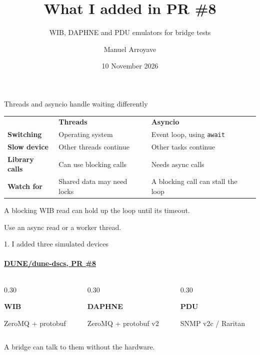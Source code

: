 \documentclass[aspectratio=169,11pt]{beamer}
\title{What I added in PR \#8}
\subtitle{WIB, DAPHNE and PDU emulators for bridge tests}
\author{Manuel Arroyave}
\date{10 November 2026}
\begin{document}
\begin{frame}[plain]
  \titlepage
\end{frame}

\begin{frame}{Threads and asyncio handle waiting differently}
  \vfill
  {\normalsize
  \renewcommand{\arraystretch}{1.7}
  \begin{tabular}{@{}p{}p{}p{}@{}}
    & \textbf{Threads} & \textbf{Asyncio} \\
    \textbf{Switching} & Operating system & Event loop, using \texttt{await} \\
    \textbf{Slow device} & Other threads continue & Other tasks continue \\
    \textbf{Library calls} & Can use blocking calls & Needs async calls \\
    \textbf{Watch for} & Shared data may need locks & A blocking call can stall the loop
  \end{tabular}\par}
  \vfill
  {\small A blocking WIB read can hold up the loop until its timeout.\par
    Use an async read or a worker thread.\par}
\end{frame}

\begin{frame}{1. I added three simulated devices}
  \framesubtitle{\href{https://github.com/DUNE/dune-dscs/pull/8}{DUNE/dune-dscs, PR \#8}}
  \vfill
  \begin{columns}[T,onlytextwidth]
    \begin{column}{0.30\textwidth}
      {\LARGE\bfseries WIB\par}\medskip
      ZeroMQ + protobuf
    \end{column}
    \begin{column}{0.30\textwidth}
      {\LARGE\bfseries DAPHNE\par}\medskip
      ZeroMQ + protobuf v2
    \end{column}
    \begin{column}{0.30\textwidth}
      {\LARGE\bfseries PDU\par}\medskip
      SNMP v2c / Raritan
    \end{column}
  \end{columns}
  \bigskip\bigskip
  {\Large A bridge can talk to them without the hardware.\par}
  \vfill
\end{frame}
\end{document}
